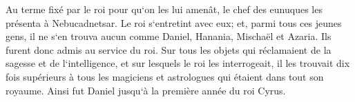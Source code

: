 \verse Au terme fixé par le roi pour qu`on les lui amenât, le chef des eunuques les présenta à Nebucadnetsar. 
\verse Le roi s`entretint avec eux; et, parmi tous ces jeunes gens, il ne s`en trouva aucun comme Daniel, Hanania, Mischaël et Azaria. Ils furent donc admis au service du roi. 
\verse Sur tous les objets qui réclamaient de la sagesse et de l`intelligence, et sur lesquels le roi les interrogeait, il les trouvait dix fois supérieurs à tous les magiciens et astrologues qui étaient dans tout son royaume. 
\verse Ainsi fut Daniel jusqu`à la première année du roi Cyrus. 

\chapter{}

